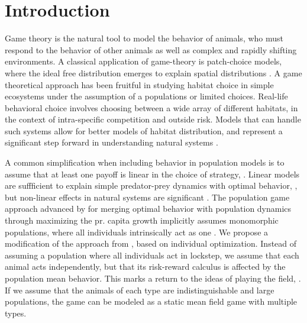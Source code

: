 \section{Introduction}

Game theory is the natural tool to model the behavior of animals, who must respond to the behavior of other animals as well as complex and rapidly shifting environments. A classical application of game-theory is patch-choice models, where the ideal free distribution emerges to explain spatial distributions  \citep{cressman2004ideal, fretwell1969territorial}. A game theoretical approach has been fruitful in studying habitat choice in simple ecosystems under the assumption of a populations or limited choices. Real-life behavioral choice involves choosing between a wide array of different habitats, in the context of intra-specific competition and outside risk. Models that can handle such systems allow for better models of habitat distribution, and represent a significant step forward in understanding natural systems \citep{morris2003shadows}.

A common simplification when including behavior in population models is to assume that at least one payoff is linear in the choice of strategy, \citep{krivan1997dynamic}. Linear models are suffficient to explain simple predator-prey dynamics with optimal behavior, \citep{kvrivan2007lotka}, but non-linear effects in natural systems are significant \citep{gross2009generalized}. The population game approach advanced by \citep{vincent2005evolutionary} for merging optimal behavior with population dynamics through maximizing the pr. capita growth implicitly assumes monomorphic populations, where all individuals intrinsically act as one \citep{malone2020ecology,stump2017optimally}. We propose a modification of the approach from \citep{vincent2005evolutionary}, based on individual optimization. Instead of assuming a population where all individuals act in lockstep, we assume that each animal acts independently, but that its risk-reward calculus is affected by the population mean behavior. This marks a return to the ideas of playing the field, \citep{smith1982evolution, cressman2010ideal}. If we assume that the animals of each type are indistinguishable and large populations, the game can be modeled as a static mean field game with multiple types.


